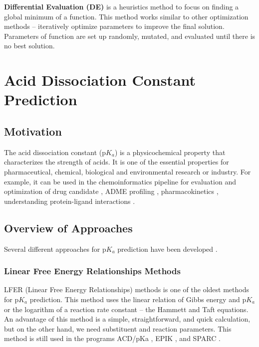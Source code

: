\textbf{Differential Evaluation (DE)} \cite{Storn1997} is a heuristics method
to focus on finding a global minimum of a function. This method works similar
to other optimization methods -- iteratively optimize parameters to improve
the final solution. Parameters of function are set up randomly, mutated, and
evaluated until there is no best solution.

\chapter{Acid Dissociation Constant Prediction}

\section{Motivation}

The acid dissociation constant (p$K_a$) is a physicochemical property that
characterizes the strength of acids. It is one of the essential properties
for pharmaceutical, chemical, biological and environmental research or industry.
For example, it can be used in the chemoinformatics pipeline for evaluation and
optimization of drug candidate \cite{Ishihama2002, Babic2007, Manallack2007},
ADME profiling \cite{Wan2006, Cruciani2009}, pharmacokinetics \cite{Comer2001},
understanding protein-ligand interactions \cite{Klebe2000, Lee2009}.

\section{Overview of Approaches}

Several different approaches for p$K_a$ prediction have been
developed \cite{Lee2009, Rupp2010, Fraczkiewicz2006, Ho2010}. 

\subsection{Linear Free Energy Relationships Methods}

LFER (Linear Free Energy Relationships) methods is one of the oldest methods \cite{Clark1964, Perrin1981} for p$K_a$
prediction. This method uses the linear relation of Gibbs energy and p$K_a$ or
the logarithm of a reaction rate constant -- the Hammett and Taft equations.
An advantage of this method is a simple, straightforward, and quick calculation,
but on the other hand, we need substituent and reaction parameters.
This method is still used in the programs ACD/pKa \cite{acd},
EPIK \cite{Shelley2008}, and SPARC \cite{Hillal1995}.

